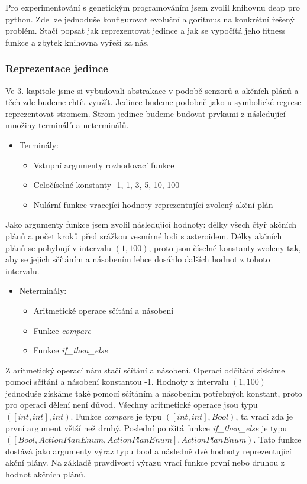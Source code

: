 Pro experimentování s genetickým programováním jsem zvolil knihovnu deap pro python. Zde lze jednoduše konfigurovat evoluční algoritmus na konkrétní řešený problém.
Stačí popsat jak reprezentovat jedince a jak se vypočítá jeho fitness funkce a zbytek knihovna vyřeší za nás.

\subsubsection{Reprezentace jedince}

Ve 3. kapitole jsme si vybudovali abstrakace v podobě senzorů a akčních plánů a těch zde budeme chtít využít.
Jedince budeme podobně jako u symbolické regrese reprezentovat stromem.
Strom jedince budeme budovat prvkami z následující množiny terminálů a neterminálů.

\begin{itemize}
\item{
    Terminály:
    \begin{itemize}
        \item Vstupní argumenty rozhodovací funkce
        \item Celočíselné konstanty -1, 1, 3, 5, 10, 100
        \item Nulární funkce vracející hodnoty reprezentující zvolený akční plán  
    \end{itemize}    
    }    
\end{itemize}
Jako argumenty funkce jsem zvolil následující hodnoty: délky všech čtyř akčních plánů a počet kroků před srážkou vesmírné lodi s asteroidem.
    Délky akčních plánů se pohybují v intervalu $(1,100)$, proto jsou číselné konstanty zvoleny tak, aby se jejich sčítáním a násobením lehce dosáhlo dalších hodnot z tohoto intervalu.


\begin{itemize}

\item{
    Neterminály:
    \begin{itemize}
        \item Aritmetické operace sčítání a násobení
        \item Funkce \emph{compare}
        \item Funkce \emph{if\_then\_else}
    \end{itemize}
}
\end{itemize}
Z aritmetický operací nám stačí sčítání a násobení. Operaci odčítání získáme pomocí sčítání a násobení konstantou -1. 
Hodnoty z intervalu $(1,100)$ jednoduše získáme také pomocí sčítáním a násobením potřebných konstant, proto pro operaci dělení není důvod.
Všechny aritmetické operace jsou typu $([int,int], int)$.
Funkce \emph{compare} je typu $([int,int], Bool)$, ta vrací zda je první argument větší než druhý.
Poslední použitá funkce \emph{if\_then\_else} je typu 
\newline
$([Bool, ActionPlanEnum, ActionPlanEnum], ActionPlanEnum)$. 
Tato funkce dostává jako argumenty výraz typu bool a následně dvě hodnoty reprezentující akční plány. 
Na základě pravdivosti výrazu vrací funkce první nebo druhou z hodnot akčních plánů.


